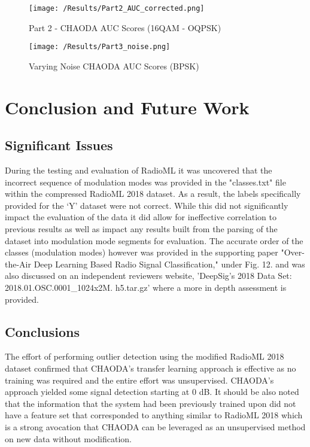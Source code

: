 \documentclass[conference]{IEEEtran}
\begin{document}
\begin{figure}[htbp]
\centering
\texttt{[image: /Results/Part2\_AUC\_corrected.png]}
\caption{Part 2 - CHAODA AUC Scores (16QAM - OQPSK)}
\label{Part2_results}
\end{figure}

\begin{figure}[htbp]
\centering
\texttt{[image: /Results/Part3\_noise.png]}
\caption{Varying Noise CHAODA AUC Scores (BPSK)}
\label{Part3_results}
\end{figure}

\section{Conclusion and Future Work}
\subsection{Significant Issues}
During the testing and evaluation of RadioML it was uncovered that the incorrect sequence of modulation modes was provided in the "classes.txt" file within the compressed RadioML 2018 dataset. As a result, the labels specifically provided for the ‘Y’ dataset were not correct. While this did not significantly impact the evaluation of the data it did allow for ineffective correlation to previous results as well as impact any results built from the parsing of the dataset into modulation mode segments for evaluation. The accurate order of the classes (modulation modes) however was provided in the supporting paper "Over-the-Air Deep Learning Based Radio Signal Classification,"  under Fig. 12. and was also discussed on an independent reviewers website, 'DeepSig’s 2018 Data Set: 2018.01.OSC.0001\_1024x2M. h5.tar.gz' where a more in depth assessment is provided. 

\subsection{Conclusions}
The effort of performing outlier detection using the modified RadioML 2018 dataset confirmed that CHAODA’s transfer learning approach is effective as no training was required and the entire effort was unsupervised. CHAODA's approach yielded some signal detection starting at 0 dB.  It should be also noted that the information that the system had been previously trained upon did not have a feature set that corresponded to anything similar to RadioML 2018 which is a strong avocation that CHAODA can be leveraged as an unsupervised method on new data without modification.
\end{document}
